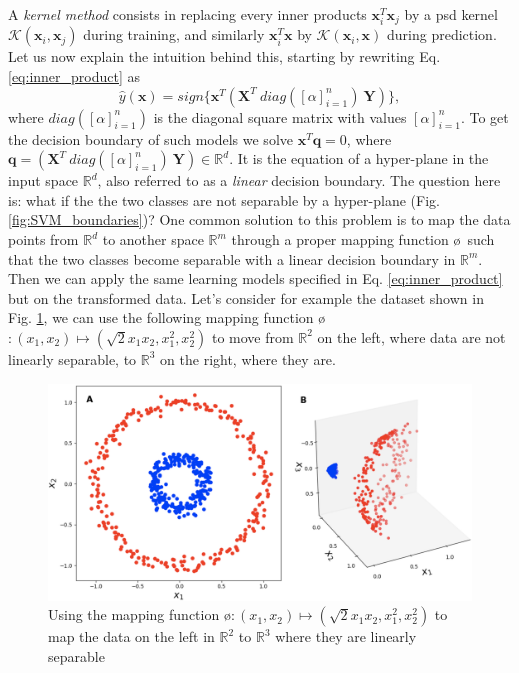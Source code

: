 A \emph{kernel method} consists in replacing every inner products $\mathbf{x}_i^T \mathbf{x}_j$ by a psd kernel $\mathcal{K}(\mathbf{x}_i, \mathbf{x}_j)$ during training, and similarly $\mathbf{x}_i^T\mathbf{x}$ by $\mathcal{K}(\mathbf{x}_i, \mathbf{x})$ during prediction.
Let us now explain the intuition behind this, starting by rewriting Eq. \ref{eq:inner_product} as 
\[
\hat{y}(\mathbf{x})=sign\{\textbf{x}^T(\mathbf{X}^T~diag([\alpha]_{i=1}^n)~\mathbf{Y})\},
\]
where $diag([\alpha]_{i=1}^n)$ is the diagonal square matrix with values $[\alpha]_{i=1}^n$. To get the decision boundary of such models we solve $\textbf{x}^T\textbf{q}=0$, where $\textbf{q}=(\mathbf{X}^T~diag([\alpha]_{i=1}^n)~\mathbf{Y})\in\mathbb{R}^d$. It is the equation of a hyper-plane in the input space $\mathbb{R}^d$, also referred to as a \emph{linear} decision boundary. The question here is: what if the the two classes are not separable by a hyper-plane (Fig. \ref{fig:SVM_boundaries})? One common solution to this problem is to map the data points from $\mathbb{R}^d$ to another space $\mathbb{R}^m$  through a proper mapping function \o~such  that the two classes become separable with a linear decision boundary in $\mathbb{R}^m$. Then we can apply the same learning models specified in Eq. \ref{eq:inner_product} but on the transformed data. Let's consider for example the dataset shown in Fig. \ref{fig:polynomial_kernel},  we can use the following mapping function \o$:(x_1,x_2)\mapsto (\sqrt{2}x_1x_2,x_1^2,x_2^2)$ to move from $\mathbb{R}^2$ on the left, where data are not linearly separable, to $\mathbb{R}^3$ on the right, where they are.
\begin{figure}[H]
\centering
\includegraphics[scale=0.25]{figs/poly_kenrnel.png}
\caption[Lifting data to a higher-dimension space to get linearly separable classes]{ Using the mapping function \o$:(x_1,x_2)\mapsto (\sqrt{2}x_1x_2,x_1^2,x_2^2)$ to map the data on the left in $\mathbb{R}^2$ to $\mathbb{R}^3$ where they are linearly separable}
\label{fig:polynomial_kernel}
\end{figure}
